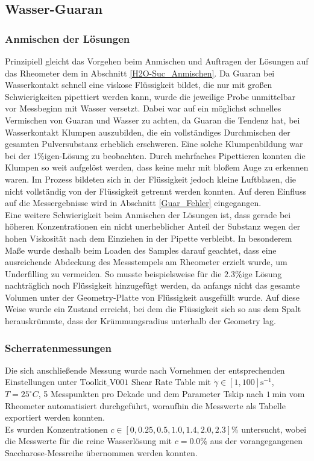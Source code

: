 \documentclass[11pt,a4paper,oneside]{scrartcl}
\begin{document}
\subsection{Wasser-Guaran}
\subsubsection{Anmischen der Lösungen}\label{anmischen_guaran}
Prinzipiell gleicht das Vorgehen beim Anmischen und Auftragen der Lösungen auf das Rheometer dem in Abschnitt \ref{H2O-Suc_Anmischen}. Da Guaran bei Wasserkontakt schnell eine viskose Flüssigkeit bildet, die nur mit großen Schwierigkeiten pipettiert werden kann, wurde die jeweilige Probe unmittelbar vor Messbeginn mit Wasser versetzt. Dabei war auf ein möglichst schnelles Vermischen von Guaran und Wasser zu achten, da Guaran die Tendenz hat, bei Wasserkontakt Klumpen auszubilden, die ein vollständiges Durchmischen der gesamten Pulversubstanz erheblich erschweren. Eine solche Klumpenbildung war bei der $1\%$igen-Lösung zu beobachten. Durch mehrfaches Pipettieren konnten die Klumpen so weit aufgelöst werden, dass keine mehr mit bloßem Auge zu erkennen waren. Im Prozess bildeten sich in der Flüssigkeit jedoch kleine Luftblasen, die nicht vollständig von der Flüssigkeit getrennt werden konnten. Auf deren Einfluss auf die Messergebnisse wird in Abschnitt \ref{Guar_Fehler} eingegangen.\\
Eine weitere Schwierigkeit beim Anmischen der Lösungen ist, dass gerade bei höheren Konzentrationen ein nicht unerheblicher Anteil der Substanz wegen der hohen Viskosität nach dem Einziehen in der Pipette verbleibt. In besonderem Maße wurde deshalb beim Loaden des Samples darauf geachtet, dass eine ausreichende Abdeckung des Messstempels am Rheometer erzielt wurde, um Underfilling zu vermeiden. So musste beispielsweise für die $2.3\%$ige Lösung nachträglich noch Flüssigkeit hinzugefügt werden, da anfangs nicht das gesamte Volumen unter der Geometry-Platte von Flüssigkeit ausgefüllt wurde. Auf diese Weise wurde ein Zustand erreicht, bei dem die Flüssigkeit sich so aus dem Spalt herauskrümmte, dass der Krümmungsradius unterhalb der Geometry lag.
\subsubsection{Scherratenmessungen}
Die sich anschließende Messung wurde nach Vornehmen der entsprechenden Einstellungen unter $\mathrm{Toolkit\_V001}$ Shear Rate Table mit $\dot\gamma\in[1,100]\mathrm s^{-1}$, $T=25^\circ C$, 5 Messpunkten pro Dekade und dem Parameter Tskip nach $1\ \mathrm{min}$ vom Rheometer automatisiert durchgeführt, woraufhin die Messwerte als Tabelle exportiert werden konnten.\\
Es wurden Konzentrationen $c\in[0,0.25,0.5,1.0,1.4,2.0,2.3]\%$ untersucht, wobei die Messwerte für die reine Wasserlösung mit $c=0.0\%$ aus der vorangegangenen Saccharose-Messreihe übernommen werden konnten.
\end{document}
